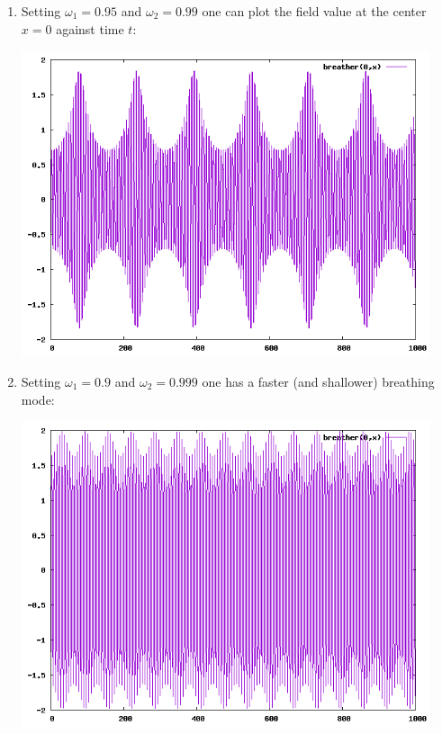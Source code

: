 \documentclass{report}
\begin{document}
\begin{enumerate}
\item
Setting $\omega_1=0.95$ and $\omega_2=0.99$ one can plot the field value at the center $x=0$ against time $t$:
\begin{center}
  \includegraphics[width=12cm]{plot/analytic_plot_95_99.png}
\end{center}
\item Setting $\omega_1=0.9$ and $\omega_2=0.999$ one has a faster (and shallower) breathing mode:
\begin{center}
  \includegraphics[width=12cm]{plot/analytic_plot_9_999.png}
\end{center}
\end{enumerate}
\end{document}
